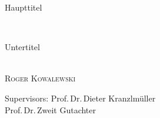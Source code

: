 \begin{titlepage}
  \phantom{}
  \vfill
  \begin{center}
    \begin{singlespace*}
    \begin{Huge}
     Haupttitel
    \end{Huge}\\[0.2cm]
    \begin{Large}
      Untertitel
    \end{Large}\\[1em]
      \vskip 0.25cm
      \textsc{Roger Kowalewski}\par
    \end{singlespace*}
  \end{center}
  \vfill
  \begin{singlespace*}
    Supervisors:            Prof.\,Dr.\,Dieter Kranzlmüller\\
    \phantom{Supervisors:}  Prof.\,Dr.\,Zweit Gutachter
  \end{singlespace*}
\end{titlepage}

\newpage
\null
\thispagestyle{empty}%
\newpage
